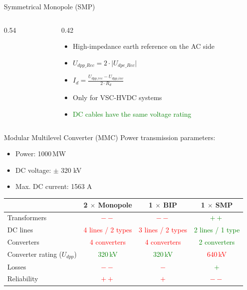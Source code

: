 \begin{frame}{Symmetrical Monopole (SMP)}
  \begin{columns}[c,onlytextwidth]
    \begin{column}{0.54\textwidth}\centering
    \end{column}
    \begin{column}{0.42\textwidth}
      \begin{itemize}
        \setlength{\itemsep}{0.25em}
        \item High-impedance earth reference on the AC side
        \item $U_{dpp\_Rec}= 2 \cdot \lvert U_{dpe\_Rec} \rvert$
        \item $I_d=\frac{U_{dpp\_rec} - U_{dpp\_inv}}{2 \cdot R_d}$
        \item Only for VSC-HVDC systems
        \item \textcolor{green}{DC cables have the same voltage rating} 
      \end{itemize}
    \end{column}
  \end{columns}
\end{frame}

\begin{frame}{Modular Multilevel Converter (MMC)}
  Power transmission parameters:
  \begin{itemize}
    \item Power: 1000\,MW
    \item DC voltage: $\pm$ 320 kV
    \item Max. DC current: 1563 A
  \end{itemize}
  \vspace{0.6em}

  \centering
  \renewcommand{\arraystretch}{1.3}
  \begin{tabular}{@{}l c c c@{}}
     & \textbf{2 $\times$ Monopole} & \textbf{1 $\times$ BIP} & \textbf{1 $\times$ SMP} \\
    \hline
    Transformers      & \textcolor{red}{$--$} & \textcolor{red}{$--$} & \textcolor{green}{$++$} \\
    DC lines          & \textcolor{red}{4 lines / 2 types} & \textcolor{red}{3 lines / 2 types} & \textcolor{green}{2 lines / 1 type}\\
    Converters        & \textcolor{red}{4 converters} & \textcolor{red}{4 converters} & \textcolor{green}{2 converters}\\
    Converter rating ($U_{dpp}$) & \textcolor{green}{320\,kV} & \textcolor{green}{320\,kV} & \textcolor{red}{640\,kV} \\
    Losses            & \textcolor{red}{$--$} & \textcolor{red}{$-$} & \textcolor{green}{$+$} \\
    Reliability       & \textcolor{red}{$++$} & \textcolor{red}{$+$} & \textcolor{red}{$--$} \\
    \hline
  \end{tabular}
\end{frame}

